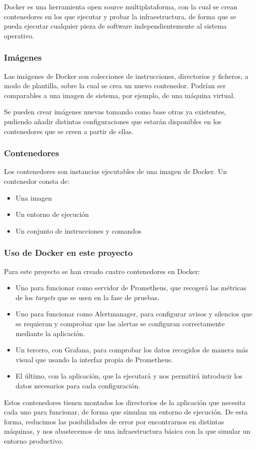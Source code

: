 Docker\cite{docker} es una herramienta open source multiplataforma, con la cual se crean contenedores en los que ejecutar y probar la infraestructura, de forma que se pueda ejecutar cualquier pieza de software independientemente al sistema operativo.

\subsubsection{Imágenes}
Las imágenes\cite{docker_image} de Docker son colecciones de instrucciones, directorios y ficheros, a modo de plantilla, sobre la cual se crea un nuevo contenedor. Podrían ser comparables a una imagen de sistema, por ejemplo, de una máquina virtual.

Se pueden crear imágenes nuevas tomando como base otras ya existentes, pudiendo añadir distintas configuraciones que estarán disponibles en los contenedores que se creen a partir de ellas.

\subsubsection{Contenedores}
Los contenedores\cite{docker_container} son instancias ejecutables de una imagen\cite{docker_image} de Docker. Un contenedor consta de:
\begin{itemize}
    \item Una imagen
    \item Un entorno de ejecución
    \item Un conjunto de instrucciones y comandos
\end{itemize}

\subsubsection*{Uso de Docker en este proyecto}

Para este proyecto se han creado cuatro contenedores en Docker:
\begin{itemize}
    \item Uno para funcionar como servidor de Prometheus, que recogerá las métricas de los	\textit{targets} que se usen en la fase de pruebas.
    \item Uno para funcionar como Alertmanager, para configurar avisos y silencios que se requieran y comprobar que las alertas se configuran correctamente mediante la aplicación.
    \item Un tercero, con Grafana, para comprobar los datos recogidos de manera más visual que usando la interfaz propia de Prometheus.
    \item El último, con la aplicación, que la ejecutará y nos permitirá introducir los datos necesarios para cada configuración.
\end{itemize}

Estos contenedores tienen montados los directorios de la aplicación que necesita cada uno para funcionar, de forma que simulan un entorno de ejecución. De esta forma, reducimos las posibilidades de error por encontrarnos en distintas máquinas, y nos abastecemos de una infraestructura básica con la que simular un entorno productivo.